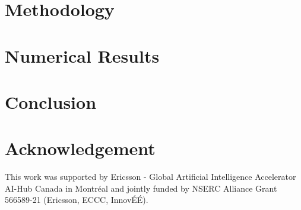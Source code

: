 \documentclass[conference]{IEEEtran}
\begin{document}
\section{Methodology} \label{Sec:Proposed}


\section{Numerical Results} \label{Sec:Simulation}


\section{Conclusion} \label{Sec:Conclusion}



\section*{Acknowledgement}
This work was supported by Ericsson - Global Artificial Intelligence Accelerator AI-Hub Canada in Montr\'{e}al and jointly funded by NSERC Alliance Grant 566589-21 (Ericsson, ECCC, Innov\'{E}\'{E}).


% 

\end{document}
